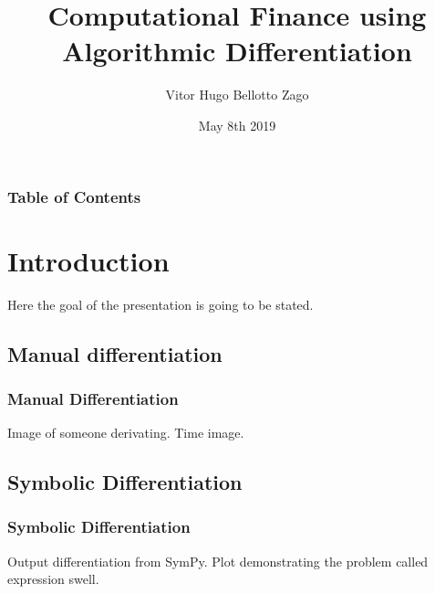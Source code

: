 \documentclass[t]{beamer}
\newcommand{\dcocpp}{{\ttfamily dco\kern-.08em{\raisebox{-.1ex}{/}\kern-.15em {c\kern-.03em{\raisebox{-.18ex}{+\kern-.028em{+}}}}}}}
\begin{document}

\title{Computational Finance using Algorithmic Differentiation}
\date{May 8th 2019}
\author{Vitor Hugo Bellotto Zago}

\frame{\titlepage}

\lstset{language=C++}
\lstset{basicstyle=\small}
\lstset{numbers=none}
\lstset{numberstyle=\scriptsize}
\lstset{numbersep=5pt}

\begin{frame}
\frametitle{Table of Contents}
\tableofcontents[currentsection]
\end{frame}



\section{Introduction}
\begin{frame}Here the goal of the presentation is going to be stated. \end{frame}


\subsection{Manual differentiation}
\begin{frame}
	\frametitle{Manual Differentiation} Image of someone derivating. Time image. 
\end{frame}

\subsection{Symbolic Differentiation}
\begin{frame}
	\frametitle{Symbolic Differentiation} 
	Output differentiation from SymPy. Plot demonstrating the problem called expression swell.
\end{frame}
\end{document}
